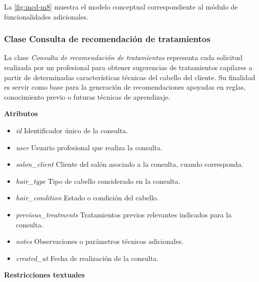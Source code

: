 La \autoref{fig:mcd-m8} muestra el modelo conceptual correspondiente al módulo de funcionalidades adicionales.


\subsubsection{Clase Consulta de recomendación de tratamientos}

La clase \textit{Consulta de recomendación de tratamientos} representa cada solicitud realizada por un profesional para obtener sugerencias de tratamientos capilares a partir de determinadas características técnicas del cabello del cliente. Su finalidad es servir como base para la generación de recomendaciones apoyadas en reglas, conocimiento previo o futuras técnicas de aprendizaje.

\textbf{Atributos}

\begin{itemize}

      \item \textit{id}
            Identificador único de la consulta.
      \item \textit{user}
            Usuario profesional que realiza la consulta.
      \item \textit{salon\_client}
            Cliente del salón asociado a la consulta, cuando corresponda.
      \item \textit{hair\_type}
            Tipo de cabello considerado en la consulta.
      \item \textit{hair\_condition}
            Estado o condición del cabello.
      \item \textit{previous\_treatments}
            Tratamientos previos relevantes indicados para la consulta.
      \item \textit{notes}
            Observaciones o parámetros técnicos adicionales.
      \item \textit{created\_at}
            Fecha de realización de la consulta.

\end{itemize}

\textbf{Restricciones textuales}


